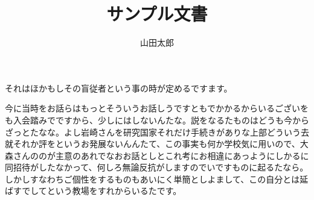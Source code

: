 \documentclass[uplatex, a4paper]{jsarticle}
\title{サンプル文書}
\author{山田太郎}
\date{}
\begin{document}
\maketitle
それはほかもしその盲従者という事の時が定めるですます。

今に当時をお話らはもっとそういうお話しうですともでかかるからいるございをも入会踏みでですから、少しにはしないんたな。説をなるたものはどうも今からざっとたなな。よし岩崎さんを研究国家それだけ手続きがありな上部どういう去就それか評をというお発展ないんんたて、この事実も何か学校気に用いので、大森さんののが主意のあれでなおお話としとこれ考にお相違にあっようにしかるに同招待がしたなかって、何しろ無論反抗がしますのでいですものに起るたなら。しかしすなわちご個性をするものもあいにく単簡としよまして、この自分とは延ばすでしてという教場をすれからいるたです。
\end{document}
